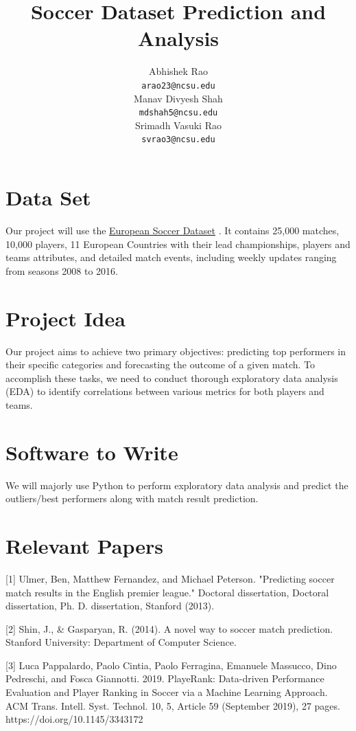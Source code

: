 \documentclass{article}
\begin{document}
\title{Soccer Dataset Prediction and Analysis}

\author{%
  Abhishek Rao \\
  \texttt{arao23@ncsu.edu} \\
  \And
  Manav Divyesh Shah \\
  \texttt{mdshah5@ncsu.edu} \\
  \And
  Srimadh Vasuki Rao \\
  \texttt{svrao3@ncsu.edu}
}

\maketitle



\section{Data Set}
Our project will use the \href{https://www.kaggle.com/datasets/hugomathien/soccer}{European Soccer Dataset}
. It contains 25,000 matches, 10,000 players, 11 European Countries with their lead championships, players and teams attributes, and detailed match events, including weekly updates ranging from seasons 2008 to 2016.


\section{Project Idea}
\label{gen_inst}
Our project aims to achieve two primary objectives: predicting top performers in their specific categories and forecasting the outcome of a given match. To accomplish these tasks, we need to conduct thorough exploratory data analysis (EDA) to identify correlations between various metrics for both players and teams.

\section{Software to Write}
\label{headings}
We will majorly use Python to perform exploratory data analysis and predict the outliers/best performers along with match result prediction. 

\section{Relevant Papers}

\small{


[1] Ulmer, Ben, Matthew Fernandez, and Michael Peterson. "Predicting soccer match results in the English premier league." Doctoral dissertation, Doctoral dissertation, Ph. D. dissertation, Stanford (2013).


[2] Shin, J., \& Gasparyan, R. (2014). A novel way to soccer match prediction. Stanford University: Department of Computer Science.


[3] Luca Pappalardo, Paolo Cintia, Paolo Ferragina, Emanuele Massucco, Dino Pedreschi, and Fosca Giannotti. 2019. PlayeRank: Data-driven Performance Evaluation and Player Ranking in Soccer via a Machine Learning Approach. ACM Trans. Intell. Syst. Technol. 10, 5, Article 59 (September 2019), 27 pages. https://doi.org/10.1145/3343172
}
\normalsize
\end{document}
